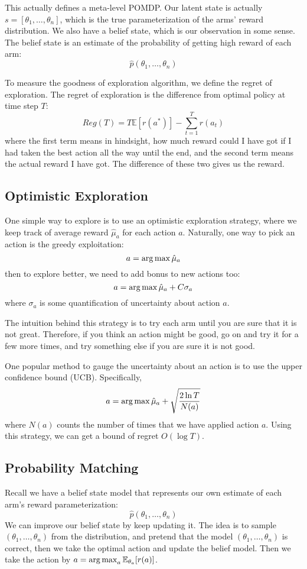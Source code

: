 This actually defines a meta-level POMDP. Our latent state is actually $s = [\theta_1,\dots,\theta_n]$, which is the true parameterization of the arms' reward distribution. We also have a belief state, which is our observation in some sense. The belief state is an estimate of the probability of getting high reward of each arm:
\[
\hat{p}(\theta_1,\dots,\theta_n)
\]

To measure the goodness of exploration algorithm, we define the regret of exploration. The regret of exploration is the difference from optimal policy at time step $T$:
\[
Reg(T) = T\mathbb{E}[r(a^*)] - \sum_{t=1}^Tr(a_t)
\]
where the first term means in hindsight, how much reward could I have got if I had taken the best action all the way until the end, and the second term means the actual reward I have got. The difference of these two gives us the reward.

\subsection{Optimistic Exploration}
One simple way to explore is to use an optimistic exploration strategy, where we keep track of average reward $\hat{\mu}_a$ for each action $a$. Naturally, one way to pick an action is the greedy exploitation:
\[
a = \operatorname*{arg\,max}\hat{\mu}_a
\]
then to explore better, we need to add bonus to new actions too:
\[
a = \operatorname*{arg\,max}\hat{\mu}_a + C\sigma_a
\]
where $\sigma_a$ is some quantification of uncertainty about action $a$. 

The intuition behind this strategy is to try each arm until you are sure that it is not great. Therefore, if you think an action might be good, go on and try it for a few more times, and try something else if you are sure it is not good.

One popular method to gauge the uncertainty about an action is to use the upper confidence bound (UCB). Specifically, 
\[
a = \operatorname*{arg\,max}\hat{\mu}_a + \sqrt{\frac{2\ln T}{N(a)}}
\]
where $N(a)$ counts the number of times that we have applied action $a$. Using this strategy, we can get a bound of regret $O(\log T)$.

\subsection{Probability Matching}
Recall we have a belief state model that represents our own estimate of each arm's reward parameterization:
\[
\hat{p}(\theta_1,\dots,\theta_n)
\]
We can improve our belief state by keep updating it. The idea is to sample $(\theta_1,\dots,\theta_n)$ from the distribution, and pretend that the model $(\theta_1,\dots,\theta_n)$ is correct, then we take the optimal action and update the belief model. Then we take the action by $a = \operatorname*{arg\,max}_a\mathbb{E}_{\theta_a}[r(a)]$.

